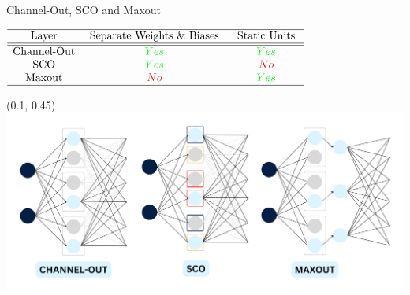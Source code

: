 \documentclass[UKenglish]{beamer}
\begin{document}
\begin{frame}{Channel-Out, SCO and Maxout}
    \vspace{0.5cm}
    \center
        \begin{table}
            $
            \begin{array}{cccc}
                \hline \text { Layer } & \text { Separate Weights $\&$ Biases } & \text { Static Units }\\
                \hline\hline\text{Channel-Out} & \textcolor{green}{Yes} &  \textcolor{green}{Yes}  \\
                \text { SCO } &  \textcolor{green}{Yes} &  \textcolor{red}{No}  \\
                \text{ Maxout } &  \textcolor{red}{No} &  \textcolor{green}{Yes}   \\
                \hline
            \end{array}
            $
        \end{table}
    \begin{textblock}{0.8}(0.1, 0.45)
        \includegraphics[width = \textwidth]{figures/EnsembleComp}
    \end{textblock}
\end{frame}
\end{document}
